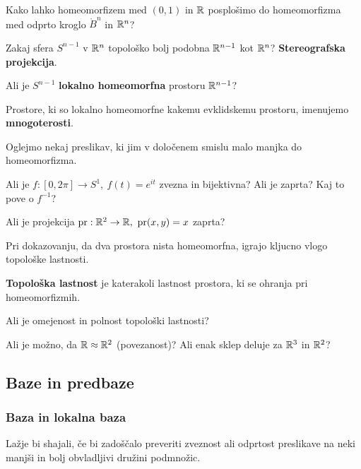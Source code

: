 \begin{primer}
    Kako lahko homeomorfizem med $(0, 1)$ in $\mathbb{R}$ posplošimo do homeomorfizma med odprto kroglo $\mathring{B}^n$ in $\mathbb{R}^n$?
\end{primer}

\begin{primer}
    Zakaj sfera $S^{n-1}$ v $\mathbb{R}^n$ topološko bolj podobna $\mathbb{R}^{n-1}$ kot $\mathbb{R}^n$? \textbf{Stereografska projekcija}.

    Ali je $S^{n-1}$ \textbf{lokalno homeomorfna} prostoru $\mathbb{R}^{n-1}$?
\end{primer}

\begin{definicija}
    Prostore, ki so lokalno homeomorfne kakemu evklidskemu prostoru, imenujemo \textbf{mnogoterosti}.
\end{definicija}

Oglejmo nekaj preslikav, ki jim v določenem smislu malo manjka do homeomorfizma.

\begin{primer}
    Ali je $f: [0, 2 \pi] \to S^1, \ f(t) = e^{it}$ zvezna in bijektivna? Ali je zaprta? Kaj to pove o $f^{-1}$?
\end{primer}

\begin{primer}
    Ali je projekcija $\pr: \R^2 \to \R, \ \pr(x,y) = x$ zaprta?
\end{primer}

Pri dokazovanju, da dva prostora nista homeomorfna, igrajo kljucno vlogo topološke lastnosti.

\begin{definicija}
    \textbf{Topološka lastnost} je katerakoli lastnost prostora, ki se ohranja pri homeomorfizmih.
\end{definicija}

\begin{primer}
    Ali je omejenost in polnost topološki lastnosti?
\end{primer}

\begin{primer}
    Ali je možno, da $\mathbb{R} \approx \mathbb{R}^2$ (povezanost)? Ali enak sklep deluje za $\mathbb{R}^3$ in $\mathbb{R}^2$?
\end{primer}

\subsection{Baze in predbaze}
\subsubsection{Baza in lokalna baza}
Lažje bi shajali, če bi zadoščalo preveriti zveznost ali odprtost preslikave na neki manjši in bolj obvladljivi družini podmnožic.

